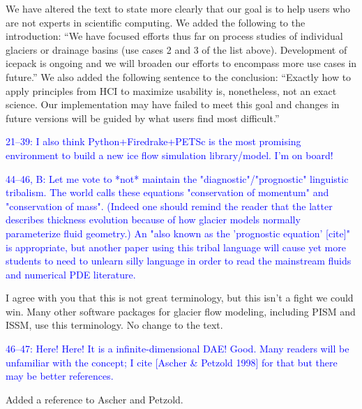 \documentclass{article}
\theoremstyle{definition}
\theoremstyle{plain}
\begin{document}
We have altered the text to state more clearly that our goal is to help users who are not experts in scientific computing.
We added the following to the introduction: ``We have focused efforts thus far on process studies of individual glaciers or drainage basins (use cases 2 and 3 of the list above).
Development of icepack is ongoing and we will broaden our efforts to encompass more use cases in future.''
We also added the following sentence to the conclusion: ``Exactly how to apply principles from HCI to maximize usability is, nonetheless, not an exact science.
Our implementation may have failed to meet this goal and changes in future versions will be guided by what users find most difficult.''

\textcolor{blue}{21--39:  I also think Python+Firedrake+PETSc is the most promising environment to build a new ice flow simulation library/model.  I'm on board!}

\textcolor{blue}{44--46, B:  Let me vote to *not* maintain the "diagnostic"/"prognostic" linguistic tribalism.  The world calls these equations "conservation of momentum" and "conservation of mass".  (Indeed one should remind the reader that the latter describes thickness evolution because of how glacier models normally parameterize fluid geometry.)  An "also known as the 'prognostic equation' [cite]" is appropriate, but another paper using this tribal language will cause yet more students to need to unlearn silly language in order to read the mainstream fluids and numerical PDE literature.}

I agree with you that this is not great terminology, but this isn't a fight we could win.
Many other software packages for glacier flow modeling, including PISM and ISSM, use this terminology.
No change to the text.

\textcolor{blue}{46--47:  Here!  Here!  It is a infinite-dimensional DAE!  Good.  Many readers will be unfamiliar with the concept; I cite [Ascher \& Petzold 1998] for that but there may be better references.}

Added a reference to Ascher and Petzold.
\end{document}
